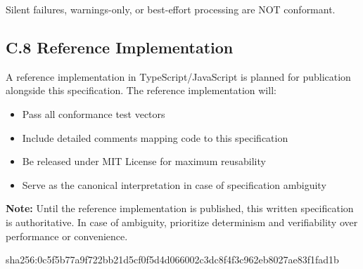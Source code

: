 \documentclass[11pt,a4paper]{article}
\begin{document}
Silent failures, warnings-only, or best-effort processing are NOT conformant.

\subsection*{C.8 Reference Implementation}

A reference implementation in TypeScript/JavaScript is planned for publication alongside this specification. The reference implementation will:
\begin{itemize}
\item Pass all conformance test vectors
\item Include detailed comments mapping code to this specification
\item Be released under MIT License for maximum reusability
\item Serve as the canonical interpretation in case of specification ambiguity
\end{itemize}

\textbf{Note:} Until the reference implementation is published, this written specification is authoritative. In case of ambiguity, prioritize determinism and verifiability over performance or convenience.

sha256:0c5f5b77a9f722bb21d5cf0f5d4d066002c3dc8f4f3c962eb8027ae83f1fad1b
\end{document}
